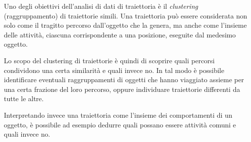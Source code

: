 Uno degli obiettivi dell'analisi di dati di traiettoria è il \textit{clustering} (raggruppamento) di traiettorie simili.
Una traiettoria può essere considerata non solo come il tragitto percorso dall'oggetto che la genera,
ma anche come l'insieme delle attività, ciascuna corrispondente a una posizione, eseguite dal medesimo oggetto.

Lo scopo del clustering di traiettorie è quindi di scoprire quali percorsi condividono una certa similarità e quali invece no.
In tal modo è possibile identificare eventuali raggruppamenti di oggetti che hanno viaggiato assieme per una certa frazione del loro percorso, oppure individuare
traiettorie differenti da tutte le altre.

Interpretando invece una traiettoria come l'insieme dei comportamenti di un oggetto,
è possibile ad esempio dedurre quali possano essere attività comuni e quali invece no.
